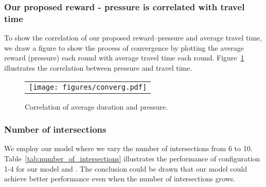 


\subsubsection{Our proposed reward - pressure is correlated with travel time}  
To show the correlation of our proposed reward--pressure and average travel time, we draw a figure to show the process of convergence by plotting the average reward (pressure) each round with average travel time each round. Figure~\ref{fig:convergence} illustrates the correlation between pressure and travel time.


\begin{figure}[t!]
\centering
  \begin{tabular}{c}
   \texttt{[image: figures/converg.pdf]} \\
   \end{tabular}
     \caption{Correlation of average duration and pressure.}
    \label{fig:convergence}
\end{figure}



\subsubsection{Number of intersections}
We employ our model where we vary the number of intersections from 6 to 10. Table~\ref{tab:number_of_intersections} illustrates the performance of configuration 1-4 for our model and \Maxpressure. The conclusion could be drawn that our model could achieve better performance even when the number of intersections grows.

